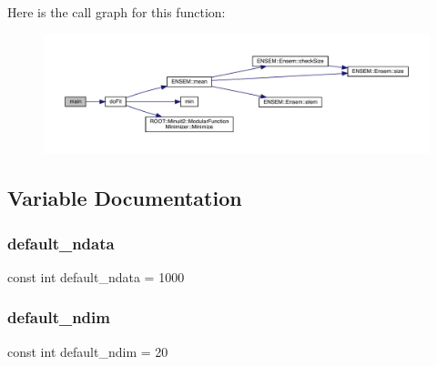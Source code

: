 Here is the call graph for this function\+:
\nopagebreak
\begin{figure}[H]
\begin{center}
\leavevmode
\includegraphics[width=350pt]{d7/df1/adat-devel_2other__libs_2minuit_2test_2MnSim_2ParallelTest_8cxx_a3c04138a5bfe5d72780bb7e82a18e627_cgraph}
\end{center}
\end{figure}


\subsection{Variable Documentation}
\mbox{\label{adat-devel_2other__libs_2minuit_2test_2MnSim_2ParallelTest_8cxx_a1baf269816008e501e2f2bc367db1a33}} 
\subsubsection{\texorpdfstring{default\_ndata}{default\_ndata}}
{\footnotesize\ttfamily const int default\+\_\+ndata = 1000}

\mbox{\label{adat-devel_2other__libs_2minuit_2test_2MnSim_2ParallelTest_8cxx_a8818f1ae401e3d26fb04dfdf8bf4a28c}} 
\subsubsection{\texorpdfstring{default\_ndim}{default\_ndim}}
{\footnotesize\ttfamily const int default\+\_\+ndim = 20}

